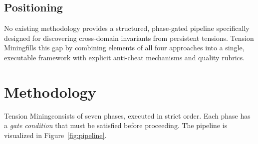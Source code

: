 \documentclass[11pt,a4paper]{article}
\newcommand{\methodname}{Tension Mining}
\begin{document}
\subsection{Positioning}
No existing methodology provides a structured, phase-gated pipeline specifically designed for discovering cross-domain invariants from persistent tensions. \methodname fills this gap by combining elements of all four approaches into a single, executable framework with explicit anti-cheat mechanisms and quality rubrics.

\section{Methodology}
\label{sec:methodology}

\methodname consists of seven phases, executed in strict order. Each phase has a \emph{gate condition} that must be satisfied before proceeding. The pipeline is visualized in Figure~\ref{fig:pipeline}.
\end{document}

